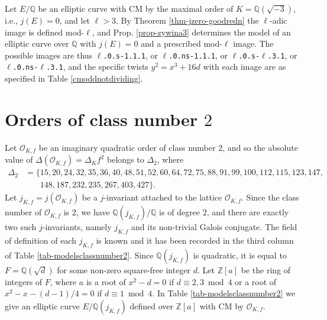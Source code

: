 \documentclass[11pt]{amsart}
\theoremstyle{definition}
\newcommand{\Q}{\mathbb Q}
\newcommand{\Z}{\mathbb Z}
\newcommand{\Of}{\mathcal{O}_{K,f}}
\begin{document}
Let $E/\Q$ be an elliptic curve with CM by the maximal order of $K=\Q(\sqrt{-3})$, i.e., $j(E)=0$, and let $\ell>3$. By Theorem \ref{thm-jzero-goodredn} the $\ell$-adic image is defined mod-$\ell$, and Prop. \ref{prop-zywina3} determines the model of an elliptic curve over $\Q$ with $j(E)=0$ and a prescribed mod-$\ell$ image.  The possible images are thus \texttt{$\ell$.0.s-1.1.1}, or \texttt{$\ell$.0.ns-1.1.1}, or \texttt{$\ell$.0.s-$\ell$.3.1}, or \texttt{$\ell$.0.ns-$\ell$.3.1}, and the specific twists $y^2=x^3+16d$ with each image are as specified in Table \ref{cmoddnotdividing}.


\section{Orders of class number $2$}\label{sec-classnumber2}

Let $\Of$ be an imaginary quadratic order of class number $2$, and so the absolute value of $\Delta(\Of)=\Delta_K f^2$ belongs to $\Delta_2$, where
\begin{align*} 
\Delta_2 &= \{15, 20, 24, 32, 35, 36, 40, 48, 51, 52, 60, 64, 72, 75, 88, 91, 99, 100, 112, 115, 123, 147,\phantom{\}}\\
& \phantom{= \{} 148, 187, 232, 235, 267, 403, 427\}.
\end{align*}
Let $j_{K,f}=j(\Of)$ be a $j$-invariant attached to the lattice $\Of$. Since the class number of $\Of$ is $2$, we have $\Q(j_{K,f})/\Q$ is of degree $2$, and there are exactly two such $j$-invariants, namely $j_{K,f}$ and its non-trivial Galois conjugate. The field of definition of each $j_{K,f}$ is known and it has been recorded in the third column of Table \ref{tab-modelsclassnumber2}. Since $\Q(j_{K,f})$ is quadratic, it is equal to $F=\Q(\sqrt{d})$ for some non-zero square-free integer $d$. Let $\Z[a]$ be the ring of integers of $F$, where $a$ is a root of $x^2-d=0$ if $d\equiv 2,3\bmod 4$ or a root of $x^2-x-(d-1)/4=0$ if $d\equiv 1 \bmod 4$. In Table \ref{tab-modelsclassnumber2} we give an elliptic curve $E/\Q(j_{K,f})$ defined over $\Z[a]$ with CM by $\Of$. 
\end{document}

